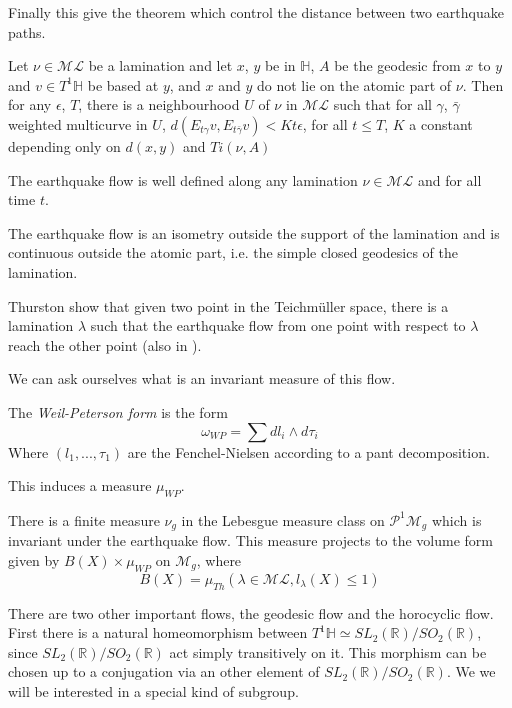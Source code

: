 Finally this give the theorem which control the distance between two earthquake paths.

\begin{prop}
Let $\nu \in \mathcal{ML}$ be a lamination and let $x$, $y$ be in $\mathbb{H}$, $A$ be the geodesic from $x$ to $y$ and $v\in T^1 \mathbb{H}$ be based at $y$, and $x$ and $y$ do not lie on the atomic part of $\nu$. Then for any $\epsilon$, $T$, there is a neighbourhood $U$ of $\nu$ in $\mathcal{ML}$ such that for all
$\gamma$, $\bar{\gamma}$ weighted multicurve in $U$, $d(E_{t \gamma}v,E_{t \bar{\gamma}}v) < K t \epsilon$, for all $t \leq T$, $K$ a constant depending only on $d(x,y)$ and $T i(\nu,A)$
\end{prop}


\begin{cor}
The earthquake flow is well defined along any lamination $\nu \in \mathcal{ML}$ and for all time $t$.
\end{cor}

\begin{rmq}
The earthquake flow is an isometry outside the support of the lamination and is continuous outside the atomic part, i.e. the simple closed geodesics of the lamination.
\end{rmq}

Thurston show that given two point in the Teichmüller space, there is a lamination $\lambda$ such that the earthquake flow from one point with respect to $\lambda$ reach the other point (also in \cite{NielsenRealizationPro}).

We can ask ourselves what is an invariant measure of this flow.

\begin{dfnt}
The \emph{Weil-Peterson form} is the form \[
\omega_{WP} = \sum d l_i \wedge d \tau_i
\]
Where $(l_1,...,\tau_1)$ are the Fenchel-Nielsen according to a pant decomposition.

This induces a measure $\mu_{WP}$.
\end{dfnt}

There is a finite measure $\nu_g$ in the Lebesgue measure class on $\mathcal{P}^1 \mathcal{M}_g$ which is invariant under the earthquake flow. This measure projects to the volume form given by $B(X) \times \mu_{WP}$ on $\mathcal{M}_g$, where \[
B(X)=\mu_{Th}(\lambda \in \mathcal{ML}, l_\lambda(X) \leq 1)
\]

There are two other important flows, the geodesic flow and the horocyclic flow.
First there is a natural homeomorphism between $T^1 \mathbb{H}  \simeq SL_2(\mathbb{R}) / SO_2(\mathbb{R})$, since $SL_2(\mathbb{R}) / SO_2(\mathbb{R})$ act simply transitively on it. This morphism can be chosen up to a conjugation via an other element of $SL_2(\mathbb{R}) / SO_2(\mathbb{R})$. We we will be interested in a special kind of subgroup.

